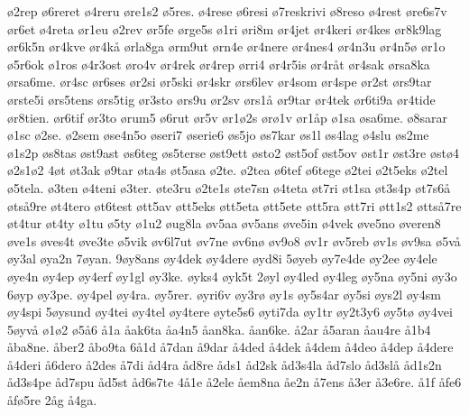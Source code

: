 ^^f82rep
^^f86reret
^^f84reru
^^f8re1s2
^^f85res.
^^f84rese
^^f86resi
^^f87reskrivi
^^f88reso
^^f84rest
^^f8re6s7v
^^f8r6et
^^f84reta
^^f8r1eu
^^f82rev
^^f8r5fe
^^f8rge5s
^^f81ri
^^f8ri8m
^^f8r4jet
^^f8r4keri
^^f8r4kes
^^f8r8k9lag
^^f8r6k5n
^^f8r4kve
^^f8r4k^^e5
^^f8rla8ga
^^f8rm9ut
^^f8rn4e
^^f8r4nere
^^f8r4nes4
^^f8r4n3u
^^f8r4n5^^f8
^^f8r1o
^^f85r6ok
^^f81ros
^^f84r3ost
^^f8ro4v
^^f8r4rek
^^f8r4rep
^^f8rri4
^^f8r4r5is
^^f8r4r^^e5t
^^f8r4sak
^^f8rsa8ka
^^f8rsa6me.
^^f8r4sc
^^f8r6ses
^^f8r2si
^^f8r5ski
^^f8r4skr
^^f8rs6lev
^^f8r4som
^^f8r4spe
^^f8r2st
^^f8rs9tar
^^f8rste5i
^^f8rs5tens
^^f8rs5tig
^^f8r3sto
^^f8rs9u
^^f8r2sv
^^f8rs1^^e5
^^f8r9tar
^^f8r4tek
^^f8r6ti9a
^^f8r4tide
^^f8r8tien.
^^f8r6tif
^^f8r3to
^^f8rum5
^^f86rut
^^f8r5v
^^f8r1^^f82s
^^f8r^^f81v
^^f8r1^^e5p
^^f81sa
^^f8sa6me.
^^f88sarar
^^f81sc
^^f82se.
^^f82sem
^^f8se4n5o
^^f8seri7
^^f8serie6
^^f8s5jo
^^f8s7kar
^^f8s1l
^^f8s4lag
^^f84slu
^^f8s2me
^^f81s2p
^^f8s8tas
^^f8st9ast
^^f8s6teg
^^f8s5terse
^^f8st9ett
^^f8sto2
^^f8st5of
^^f8st5ov
^^f8st1r
^^f8st3re
^^f8st^^f84
^^f82s1^^f82
4^^f8t
^^f8t3ak
^^f89tar
^^f8ta4s
^^f8t5asa
^^f82te.
^^f82tea
^^f86tef
^^f86tege
^^f82tei
^^f82t5eks
^^f82tel
^^f85tela.
^^f83ten
^^f84teni
^^f83ter.
^^f8te3ru
^^f82te1s
^^f8te7sn
^^f84teta
^^f8t7ri
^^f8t1sa
^^f8t3s4p
^^f8t7s6^^e5
^^f8ts^^e59re
^^f8t4tero
^^f8t6test
^^f8tt5av
^^f8tt5eks
^^f8tt5eta
^^f8tt5ete
^^f8tt5ra
^^f8tt7ri
^^f8tt1s2
^^f8tts^^e57re
^^f8t4tur
^^f8t4ty
^^f81tu
^^f85ty
^^f81u2
^^f8ug8la
^^f8v5aa
^^f8v5ans
^^f8ve5in
^^f84vek
^^f8ve5no
^^f8veren8
^^f8ve1s
^^f8ves4t
^^f8ve3te
^^f85vik
^^f8v6l7ut
^^f8v7ne
^^f8v6n^^f8
^^f8v9o8
^^f8v1r
^^f8v5reb
^^f8v1s
^^f8v9sa
^^f85v^^e5
^^f8y3al
^^f8ya2n
7^^f8yan.
9^^f8y8ans
^^f8y4dek
^^f8y4dere
^^f8yd8i
5^^f8yeb
^^f8y7e4de
^^f8y2ee
^^f8y4ele
^^f8ye4n
^^f8y4ep
^^f8y4erf
^^f8y1gl
^^f8y3ke.
^^f8yks4
^^f8yk5t
2^^f8yl
^^f8y4led
^^f8y4leg
^^f8y5na
^^f8y5ni
^^f8y3o
6^^f8yp
^^f8y3pe.
^^f8y4pel
^^f8y4ra.
^^f8y5rer.
^^f8yri6v
^^f8y3r^^f8
^^f8y1s
^^f8y5s4ar
^^f8y5si
^^f8ys2l
^^f8y4sm
^^f8y4spi
5^^f8ysund
^^f8y4tei
^^f8y4tel
^^f8y4tere
^^f8yte5s6
^^f8yti7da
^^f8y1tr
^^f8y2t3y6
^^f8y5t^^f8
^^f8y4vei
5^^f8yv^^e5
^^f81^^f82
^^f85^^e56
^^e51a
^^e5ak6ta
^^e5a4n5
^^e5an8ka.
^^e5an6ke.
^^e52ar
^^e55aran
^^e5au4re
^^e51b4
^^e5ba8ne.
^^e5ber2
^^e5bo9ta
6^^e51d
^^e57dan
^^e59dar
^^e54ded
^^e54dek
^^e54dem
^^e54deo
^^e54dep
^^e54dere
^^e54deri
^^e56dero
^^e52des
^^e57di
^^e5d4ra
^^e5d8re
^^e5ds1
^^e5d2sk
^^e5d3s4la
^^e5d7slo
^^e5d3sl^^e5
^^e5d1s2n
^^e5d3s4pe
^^e5d7spu
^^e5d5st
^^e5d6s7te
4^^e51e
^^e52ele
^^e5em8na
^^e5e2n
^^e57ens
^^e53er
^^e53e6re.
^^e51f
^^e5fe6
^^e5f^^f85re
2^^e5g
^^e54ga.
